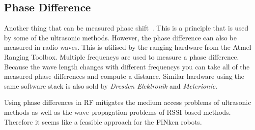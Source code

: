 \subsection{Phase Difference}

Another thing that can be measured phase shift~\cite{2_kluge_eggert_2009}.
This is a principle that is used by some of the ultrasonic methods.
However, the phase difference can also be measured in radio waves.
This is utilised by the ranging hardware from the Atmel Ranging Toolbox.
Multiple frequencys are used to measure a phase difference.
Because the wave length changes with different frequencys you can take all of the measured phase differences and compute a distance.
Similar hardware using the same software stack is also sold by \emph{Dresden Elektronik} and \emph{Meterionic}.

Using phase differences in RF mitigates the medium access problems of ultrasonic methods as well as the wave propagation problems of RSSI-based methods.
Therefore it seems like a feasible approach for the FINken robots.


